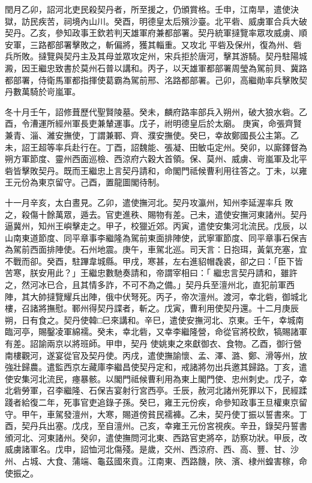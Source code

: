 \begin{pinyinscope}
 閏月乙卯，詔河北吏民殺契丹者，所至援之，仍頒賞格。壬申，江南旱，遣使決獄，訪民疾苦，祠境內山川。癸酉，明德皇太后殯沙臺。北平砦、威虜軍合兵大破契丹。乙亥，參知政事王欽若判天雄軍府兼都部署。契丹統軍撻覽率眾攻威虜、順安軍，三路都部署擊敗之，斬偏將，獲其輜重。又攻北
 平砦及保州，復為州、砦兵所敗。撻覽與契丹主及其母並眾攻定州，宋兵拒於唐河，擊其游騎。契丹駐陽城澱，因王繼忠致書於莫州石普以講和。丙子，以天雄軍都部署周瑩為駕前貝、冀路都部署，侍衛馬軍都指揮使葛霸為駕前邢、洺路都部署。己卯，高繼勛率兵擊敗契丹數萬騎於岢嵐軍。



 冬十月壬午，詔修葺歷代聖賢陵墓。癸未，麟府路率部兵入朔州，破大狼水砦。乙酉，令漕運所經州軍長吏兼輦運事。戊子，祔明德皇后於太廟。
 庚寅，命張齊賢兼青、淄、濰安撫使，丁謂兼鄆、齊、濮安撫使。癸巳，幸故鄭國長公主第。乙未，詔王超等率兵赴行在。丁酉，詔魏能、張凝、田敏屯定州。癸卯，以廝鐸督為朔方軍節度、靈州西面巡檢、西涼府六穀大首領。保、莫州、威虜、岢嵐軍及北平砦皆擊敗契丹。既而王繼忠上言契丹請和，命閣門祗候曹利用往答之。丁未，以雍王元份為東京留守。己酉，置龍圖閣待制。



 十一月辛亥，太白晝見。乙卯，遣使撫河北。契丹攻瀛州，知州李延渥率兵
 敗之，殺傷十餘萬眾，遁去。官吏進秩、賜物有差。己未，遣使安撫河東諸州。契丹逼冀州，知州王嶼擊走之。甲子，校獵近郊。丙寅，遣使安集河北流民。戊辰，以山南東道節度、同平章事李繼隆為駕前東面排陣使，武寧軍節度、同平章事石保吉為駕前西面排陣使。石州地震。庚午，車駕北巡。司天言：日抱珥，黃氣充塞，宜不戰而卻。癸酉，駐蹕韋城縣。甲戌，寒甚，左右進貂帽毳裘，卻之曰：「臣下皆苦寒，朕安用此？」王繼忠數馳奏請和，帝謂宰相曰：「
 繼忠言契丹請和，雖許之，然河冰已合，且其情多詐，不可不為之備。」契丹兵至澶州北，直犯前軍西陣，其大帥撻覽耀兵出陣，俄中伏弩死。丙子，帝次澶州。渡河，幸北砦，御城北樓，召諸將撫慰。鄆州得契丹諜者，斬之。戊寅，曹利用使契丹還。十二月庚辰朔，日有食之。契丹使韓□巳來講和。辛巳，遣使安撫河北、京東。壬午，幸城南臨河亭，賜鑿凌軍綿襦。癸未，幸北砦，又幸李繼隆營，命從官將校飲，犒賜諸軍有差。詔諭兩京以將班師。甲申，契丹
 使姚東之來獻御衣、食物。乙酉，御行營南樓觀河，遂宴從官及契丹使。丙戌，遣使撫諭懷、孟、澤、潞、鄭、滑等州，放強壯歸農。遣監西京左藏庫李繼昌使契丹定和，戒諸將勿出兵邀其歸路。丁亥，遣使安集河北流民，瘞暴骸。以閣門祗候曹利用為東上閣門使、忠州刺史。戊子，幸北砦勞軍，召李繼隆、石保吉宴射行宮西亭。壬辰，赦河北諸州死罪以下，民經蹂踐者給復二年，死事官吏追錄子孫。癸巳，雍王元份疾，命參知政事王旦權東京留
 守。甲午，車駕發澶州，大寒，賜道傍貧民襦褲。乙未，契丹使丁振以誓書來。丁酉，契丹兵出塞。戊戌，至自澶州。己亥，幸雍王元份宮視疾。辛丑，錄契丹誓書頒河北、河東諸州。癸卯，遣使撫問河北東、西路官吏將卒，訪察功狀。甲辰，改威虜諸軍名。戊申，詔恤河北傷殘。是歲，交州、西涼府、西、高、豐、甘、沙州、占城、大食、蒲端、龜茲國來貢。江南東、西路饑，陜、濱、棣州蝗害稼，命使振之。




\end{pinyinscope}
